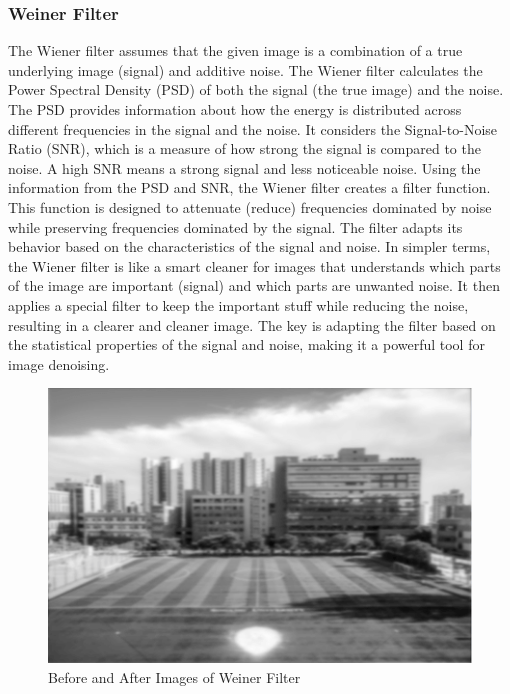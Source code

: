 \documentclass[10pt]{article}
\begin{document}
\begin{multicols}{2}
\subsubsection{Weiner Filter}
The Wiener filter assumes that the given image is a combination of a true underlying image (signal) and additive noise. The Wiener filter calculates the Power Spectral Density (PSD) of both the signal (the true image) and the noise. The PSD provides information about how the energy is distributed across different frequencies in the signal and the noise. It considers the Signal-to-Noise Ratio (SNR), which is a measure of how strong the signal is compared to the noise. A high SNR means a strong signal and less noticeable noise.
\newline \newline
Using the information from the PSD and SNR, the Wiener filter creates a filter function. This function is designed to attenuate (reduce) frequencies dominated by noise while preserving frequencies dominated by the signal. The filter adapts its behavior based on the characteristics of the signal and noise.
\newline \newline
In simpler terms, the Wiener filter is like a smart cleaner for images that understands which parts of the image are important (signal) and which parts are unwanted noise. It then applies a special filter to keep the important stuff while reducing the noise, resulting in a clearer and cleaner image. The key is adapting the filter based on the statistical properties of the signal and noise, making it a powerful tool for image denoising.
\begin{figure}[H]
    \centering
    \includegraphics[width=1\linewidth]{Images/Week 3/weiner-ex.png}
    \caption{Before and After Images of Weiner Filter}
\end{figure}


\end{multicols}
\end{document}

